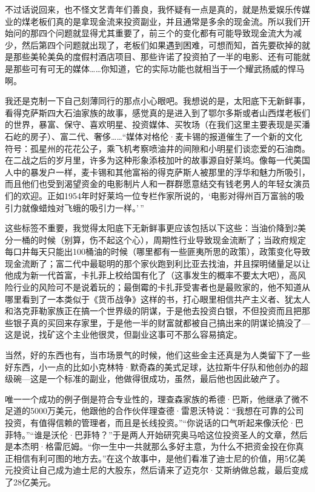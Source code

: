不过话说回来，也不怪文艺青年们善良，我怀疑有一点是真的，就是热爱娱乐传媒业的煤老板们真的是拿现金流来投资副业，并且通常是多余的现金流。所以我们开始问的那四个问题就显得尤其重要了，前三个的变化都有可能导致现金流大为减少，然后第四个问题就出现了，老板们如果遇到困难，可想而知，首先要砍掉的就是那些美轮美奂的度假村酒店项目、那些许诺了投资拍了一半的电影、还有可能就是那些可有可无的媒体\ldots\ldots 你知道，它的实际功能也就相当于一个耀武扬威的悍马啊。

我还是克制一下自己刻薄同行的那点小心眼吧。我想说的是，太阳底下无新鲜事，看得克萨斯四大石油家族的故事，感觉真的是进入到了鄂尔多斯或者山西煤老板们的世界，暴富、保守、喜欢明星、投资媒体、买牧场（在我们这里主要表现是买潘石屹的房子）、富二代、奢侈\ldots\ldots{}``媒体对格伦·麦卡锡的报道催生了一个新的文化符号：孤星州的花花公子，乘飞机考察喷油井的间隙和小明星们谈恋爱的石油商。在二战之后的岁月里，许多为这种形象添枝加叶的故事源自好莱坞。像每一代美国人中的暴发户一样，麦卡锡和其他富裕的得克萨斯人被那里的浮华和魅力所吸引，而且他们也受到渴望资金的电影制片人和一群群愿意结交有钱老男人的年轻女演员们的欢迎。正如1954年时好莱坞一位专栏作家所说的，`电影对得州百万富翁的吸引力就像蜡烛对飞蛾的吸引力一样。'\,''

这些标签不重要，我觉得太阳底下无新鲜事更应该包括以下这些：当油价降到2美分一桶的时候（别算，伤不起这个心），周期性行业导致现金流断了；当政府规定每口井每天只能出100桶油的时候（哪里都有一些匪夷所思的政策），政策变化导致现金流断了；富二代中最聪明的那个家伙跑到利比亚去找油，并且探明储量足以让他成为新一代首富，卡扎菲上校给国有化了（这事发生的概率不要太大吧），高风险行业的风险可不是说着玩的；最倒霉的卡扎菲受害者也是最败家的，他不知道从哪里看到了一本类似于《货币战争》这样的书，打心眼里相信共产主义者、犹太人和洛克菲勒家族正在搞一个世界级的阴谋，于是他去投资白银，不但投资而且把那些银子真的买回来存家里，于是他一半的财富就都被自己搞出来的阴谋论搞没了---这是说，找矿这个主业他很灵，但副业这事可不那么容易搞定。

当然，好的东西也有，当市场景气的时候，他们这些金主还真是为人类留下了一些好东西，小一点的比如小克林特·默奇森的美式足球，达拉斯牛仔队和他创办的超级碗---这是一个标准的副业，他做得很成功，虽然，最后他也因此破产了。

唯一一个成功的例子倒是符合专业性的，理查森家族的希德·巴斯，他继承了微不足道的5000万美元，他跟他的合作伙伴理查德·雷恩沃特说：``我想在可靠的公司投资，有值得信赖的管理者，而且是长线投资。''``你说话的口气听起来像沃伦·巴菲特。''``谁是沃伦·巴菲特？''于是两人开始研究奥马哈这位投资圣人的文章，然后是本杰明·格雷厄姆。``你一生中一共就那么多好主意，为什么不把资金投在你真正相信有利可图的地方去。''在这个故事中，是他们看准了迪士尼的价值，用5亿美元投资让自己成为迪士尼的大股东，然后请来了迈克尔·艾斯纳做总裁，最后变成了28亿美元。

